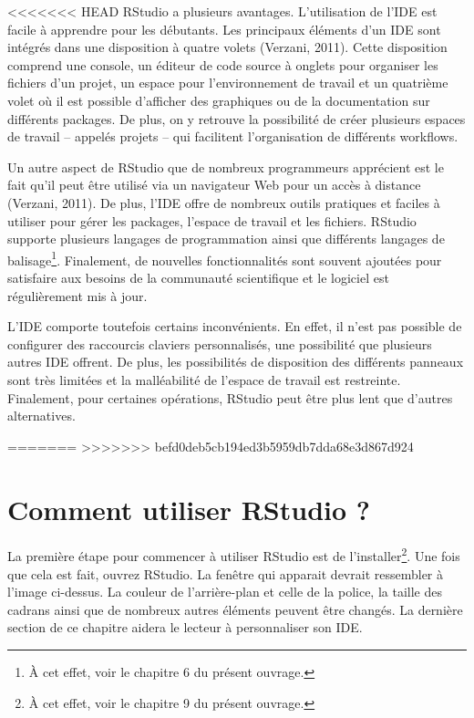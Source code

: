 \documentclass[
  letterpaper,
]{scrbook}
\begin{document}
<<<<<<< HEAD
RStudio a plusieurs avantages. L'utilisation de l'IDE est facile à
apprendre pour les débutants. Les principaux éléments d'un IDE sont
intégrés dans une disposition à quatre volets (Verzani, 2011). Cette
disposition comprend une console, un éditeur de code source à onglets
pour organiser les fichiers d'un projet, un espace pour l'environnement
de travail et un quatrième volet où il est possible d'afficher des
graphiques ou de la documentation sur différents packages. De plus, on y
retrouve la possibilité de créer plusieurs espaces de travail -- appelés
projets -- qui facilitent l'organisation de différents workflows.

Un autre aspect de RStudio que de nombreux programmeurs apprécient est
le fait qu'il peut être utilisé via un navigateur Web pour un accès à
distance (Verzani, 2011). De plus, l'IDE offre de nombreux outils
pratiques et faciles à utiliser pour gérer les packages, l'espace de
travail et les fichiers. RStudio supporte plusieurs langages de
programmation ainsi que différents langages de balisage\footnote{À cet
  effet, voir le chapitre 6 du présent ouvrage.}. Finalement, de
nouvelles fonctionnalités sont souvent ajoutées pour satisfaire aux
besoins de la communauté scientifique et le logiciel est régulièrement
mis à jour.

L'IDE comporte toutefois certains inconvénients. En effet, il n'est pas
possible de configurer des raccourcis claviers personnalisés, une
possibilité que plusieurs autres IDE offrent. De plus, les possibilités
de disposition des différents panneaux sont très limitées et la
malléabilité de l'espace de travail est restreinte. Finalement, pour
certaines opérations, RStudio peut être plus lent que d'autres
alternatives.

=======
>>>>>>> befd0deb5cb194ed3b5959db7dda68e3d867d924
\hypertarget{comment-utiliser-rstudio}{%
\section{Comment utiliser RStudio ?}\label{comment-utiliser-rstudio}}

La première étape pour commencer à utiliser RStudio est de
l'installer\footnote{À cet effet, voir le chapitre 9 du présent ouvrage.}.
Une fois que cela est fait, ouvrez RStudio. La fenêtre qui apparait
devrait ressembler à l'image ci-dessus. La couleur de l'arrière-plan et
celle de la police, la taille des cadrans ainsi que de nombreux autres
éléments peuvent être changés. La dernière section de ce chapitre aidera
le lecteur à personnaliser son IDE.
\end{document}
